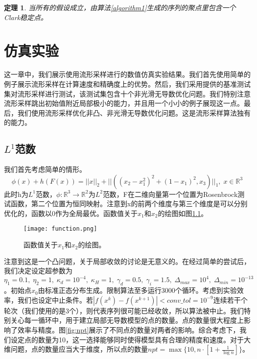 \documentclass[macfonts]{njuthesis}
\newtheorem{thm}{定理}[chapter]
\begin{document}
\begin{thm}
\label{mainthm}
当所有的假设成立，由算法\ref{algorithm1}生成的序列的聚点里包含一个Clark稳定点。
\end{thm}

\chapter{仿真实验}
这一章中，我们展示使用流形采样进行的数值仿真实验结果。我们首先使用简单的例子展示流形采样在计算速度和精确度上的优势。然后，我们采用\cite{benchmark}提供的基准测试集对流形采样进行测试，该测试集包含十个非光滑无导数优化问题。我们特别注意流形采样跳出初始值附近局部极小的能力，并且用一个小小的例子展现这一点。最后，我们使用流形采样优化非凸、非光滑无导数优化问题。这是流形采样算法独有的能力。

\section{$L^1$范数}
我们首先考虑简单的情形。
\begin{equation}
\label{testfunc1}
\phi(x)+h(F(x))=||x||_2+||((x_2-x_1^2)^2+(1-x_1)^2,x_3)||_1,\;x\in \mathbb{R}^3
\end{equation}
此时h为$L^1$范数，$\phi : \mathbb{R}^3 \to \mathbb{R}^2$为$L^2$范数，F在二维向量第一个位置为Rosenbrock测试函数，第二个位置为恒同映射。注意到x的前两个维度与第三个维度是可以分别优化的，函数以0作为全局最优。函数值关于$x_1$和$x_2$的绘图如图\ref{fig:function}。

\begin{figure}[h]
\centering
\texttt{[image: function.png]}
\caption{函数值关于$x_1$和$x_2$的绘图。}
\label{fig:function}
\end{figure} 

注意到这是一个凸问题，关于局部收敛的讨论是无意义的。在经过简单的尝试后，我们决定设定超参数为$\eta_1=0.1,\;\eta_2=1,\;\kappa_d=10^{-4},\;\kappa_H=1,\;\gamma_d=0.5,\;\gamma_i=1.5,\;\Delta_{max}=10^4,\;\Delta_{min}=10^{-13}$。初始点$x_0$由标准正态分布生成。限制算法至多运行3000个循环。考虑到实验效率，我们也设定中止条件。若$\left|f(x^k)-f(x^{k+1})\right|<conv\_tol=10^{-9}$连续若干个轮次（我们使用的是3个），则代表序列很可能已经收敛，所以算法被中止。我们特别关心每一循环中，用于建立局部无导数模型的点的数量。点的数量很大程度上影响了效率与精度。图\ref{fig:npt}展示了不同点的数量对两者的影响。综合考虑下，我们设定点的数量为10，这一选择能够同时使得模型具有合理的精度和速度。对于大维问题，点的数量应当大于维度，所以点的数量$npt=\max\{10,n\cdot[1+\frac{1}{\log{n}}]\}$。
\end{document}
